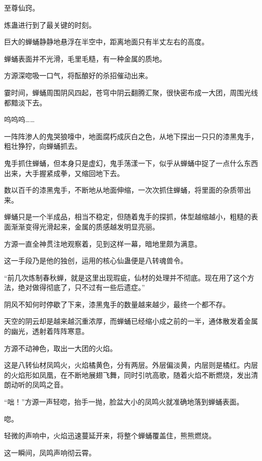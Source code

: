 
\begin{this_body}



至尊仙窍。

炼蛊进行到了最关键的时刻。

巨大的蝉蛹静静地悬浮在半空中，距离地面只有半丈左右的高度。

蝉蛹表面并不光滑，毛里毛糙，有一种金属的质地。

方源深唿吸一口气，将酝酿好的杀招催动出来。

霎时间，蝉蛹周围阴风四起，苍穹中阴云翻腾汇聚，很快密布成一大团，周围光线都黯淡下去。

呜呜呜……

一阵阵渗人的鬼哭狼嚎中，地面腐朽成灰白之色，从地下探出一只只的漆黑鬼手，粗壮狰狞，向蝉蛹抓去。

鬼手抓住蝉蛹，但本身只是虚幻，鬼手荡漾一下，似乎从蝉蛹中捉了一点什么东西出来，大手握紧成拳，又缩回地下去。

数以百千的漆黑鬼手，不断地从地面伸缩，一次次抓住蝉蛹，将里面的杂质带出来。

蝉蛹只是一个半成品，相当不稳定，但随着鬼手的探抓，体型越缩越小，粗糙的表面渐渐变得光滑起来，金属的质感越发明显亮丽。

方源一直全神贯注地观察着，见到这样一幕，暗地里颇为满意。

这一手段乃是他的独创，运用的核心仙蛊便是八转魂兽令。

“前几次炼制春秋蝉，就是这里出现瑕疵，仙材的处理并不彻底。现在用了这个方法，绝对做得彻底了，只不过有一些后遗症。”

阴风不知何时停歇了下来，漆黑鬼手的数量越来越少，最终一个都不存。

天空的阴云却是越来越沉重浓厚，而蝉蛹已经缩小成之前的一半，通体散发着金属的幽光，透射着阵阵寒意。

方源不动神色，取出一大团的火焰。

这是八转仙材凤鸣火，火焰橘黄色，分有两层。外层偏淡黄，内层则是橘红。内层的火焰形如凤凰，在不断地展翅飞舞，同时引吭高歌，随着火焰不断燃烧，发出清朗动听的凤鸣之音。

“咄！”方源一声轻唿，抬手一抛，脸盆大小的凤鸣火就准确地落到蝉蛹表面。

唿。

轻微的声响中，火焰迅速蔓延开来，将整个蝉蛹覆盖住，熊熊燃烧。

这一瞬间，凤鸣声响彻云霄。


\end{this_body}
